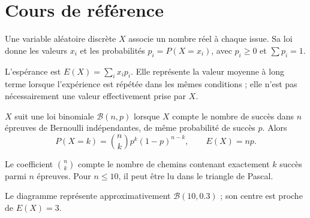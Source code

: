 
\section{Cours de référence}
Une variable aléatoire discrète $X$ associe un nombre réel à chaque issue. Sa loi donne les valeurs $x_i$ et les probabilités $p_i=P(X=x_i)$, avec $p_i\geq0$ et $\sum p_i=1$.

\begin{keypoint}
L'espérance est $E(X)=\sum_i x_ip_i$. Elle représente la valeur moyenne à long terme lorsque l'expérience est répétée dans les mêmes conditions ; elle n'est pas nécessairement une valeur effectivement prise par $X$.
\end{keypoint}

\begin{center}
\end{center}

\begin{keypoint}
$X$ suit une loi binomiale $\mathcal B(n,p)$ lorsque $X$ compte le nombre de succès dans $n$ épreuves de Bernoulli indépendantes, de même probabilité de succès $p$. Alors
\[
P(X=k)=\binom nk p^k(1-p)^{n-k},\qquad E(X)=np.
\]
\end{keypoint}

Le coefficient $\binom nk$ compte le nombre de chemins contenant exactement $k$ succès parmi $n$ épreuves. Pour $n\leq10$, il peut être lu dans le triangle de Pascal.

\begin{center}
\end{center}
Le diagramme représente approximativement $\mathcal B(10,\num{0,3})$ ; son centre est proche de $E(X)=3$.

